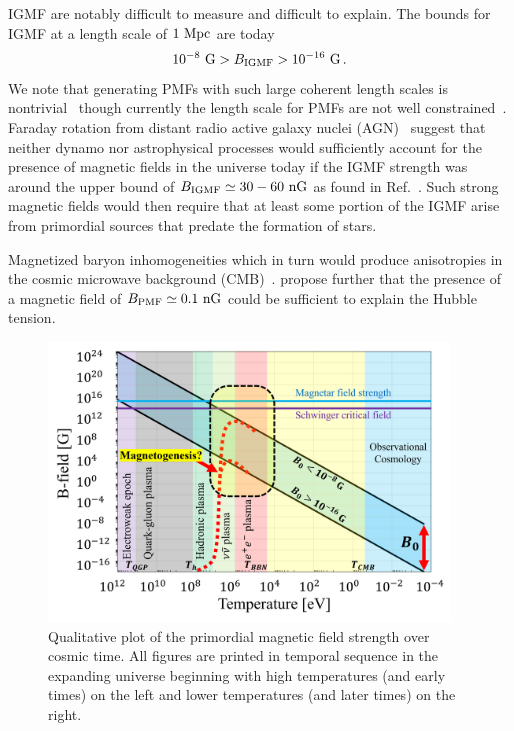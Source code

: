 IGMF are notably difficult to measure and difficult to explain. The bounds for IGMF at a length scale of $1{\rm\ Mpc}$ are today~\cite{Neronov:2010gir,Taylor:2011bn,Pshirkov:2015tua,Jedamzik:2018itu,Vernstrom:2021hru}
\begin{gather}
 \label{igmf}
 10^{-8}{\rm\ G}>B_\mathrm{IGMF}>10^{-16}{\rm\ G}\,.
\end{gather}
We note that generating PMFs with such large coherent length scales is nontrivial~\cite{Giovannini:2022rrl} though currently the length scale for PMFs are not well constrained~\cite{AlvesBatista:2021sln}. Faraday rotation from distant radio active galaxy nuclei (AGN)~\cite{Pomakov:2022cem} suggest that neither dynamo nor astrophysical processes would sufficiently account for the presence of magnetic fields in the universe today if the IGMF strength was around the upper bound of $B_\mathrm{IGMF}\simeq30-60{\rm\ nG}$ as found in Ref.~\cite{Vernstrom:2021hru}. Such strong magnetic fields would then require that at least some portion of the IGMF arise from primordial sources that predate the formation of stars.

Magnetized baryon inhomogeneities which in turn would produce anisotropies in the cosmic microwave background (CMB)~\cite{Jedamzik:2013gua,Abdalla:2022yfr}. \cite{Jedamzik:2020krr} propose further that the presence of a magnetic field of $B_\mathrm{PMF}\simeq0.1{\rm\ nG}$ could be sufficient to explain the Hubble tension.

\begin{figure}[ht]
    \centering
    \includegraphics[width=0.95\textwidth]{plots/chap04cosmo/pmf.png}
    \caption{Qualitative plot of the primordial magnetic field strength over cosmic time. All figures are printed in temporal sequence in the expanding universe beginning with high temperatures (and early times) on the left and lower temperatures (and later times) on the right.}
    \label{fig:pmf}
\end{figure}

